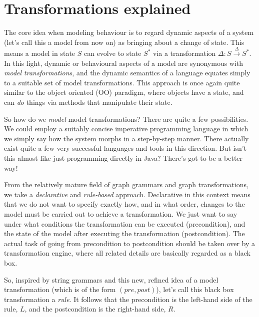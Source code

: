 \newpage
\hypertarget{explanation}{}
\section{Transformations explained}
\genHeader

The core idea when modeling behaviour is to regard dynamic aspects of a system (let's call this a model from now on) as bringing about a change of state.
This means a model in state $S$ can evolve to state $S^*$ via a transformation $\Delta: S \stackrel{\Delta}{\rightarrow}S^*$. In this light, dynamic or
behavioural aspects of a model are synonymous with \emph{model transformations}, and the dynamic semantics of a language equates simply to a suitable set of
model transformations. This approach is once again quite similar to the object oriented (OO) paradigm, where objects have a state, and can \emph{do} things via
methods that manipulate their state.

So how do we \emph{model} model transformations?  There are quite a few possibilities. We could employ a suitably concise imperative programming language in
which we simply say how the system morphs in a step-by-step manner. There actually exist quite a few very successful languages and tools in this direction. But
isn't this almost like just programming directly in Java? There's got to be a better way! 

From the relatively mature field of graph grammars and graph transformations, we take a \emph{declarative} and \emph{rule-based} approach. Declarative in this
context means that we do not want to specify exactly how, and in what order, changes to the model must be carried out to achieve a transformation. We just want
to say under what conditions the transformation can be executed (precondition), and the state of the model after executing the transformation (postcondition).
The actual task of going from precondition to postcondition should be taken over by a transformation engine, where all related details are basically regarded as
a black box.

So, inspired by string grammars and this new, refined idea of a model transformation (which is of the form $(pre, post)$), let's call this black box
transformation a \emph{rule}. It follows that the precondition is the left-hand side of the rule, $L$, and the postcondition is the right-hand side, $R$.

